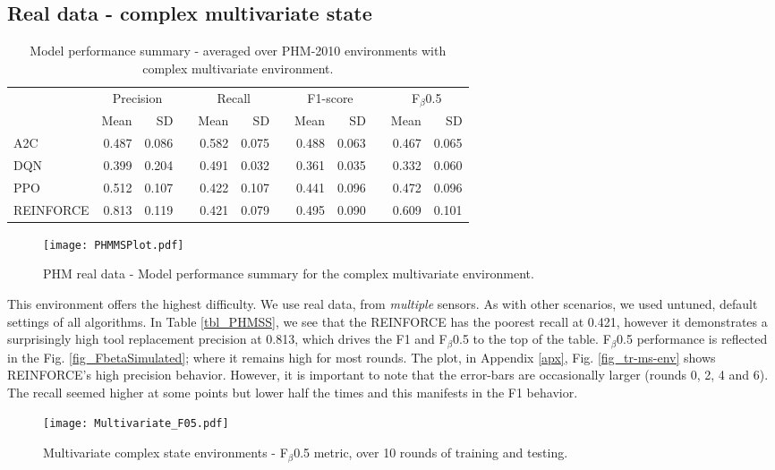 \documentclass[referee, sn-mathphys-num]{sn-jnl}
\newcommand{\rowspace}[1]{\renewcommand{\arraystretch}{#1}}
\begin{document}
	\subsection{Real data - complex multivariate state}
	\begin{table}
		\rowspace{1.3}
		\caption{Model performance summary - averaged over PHM-2010 environments with complex multivariate environment.}
		{\begin{tabular}{@{}l rr c rr c rr c rr@{}}
				\arrayrulecolor{black!40}\toprule
				& \multicolumn{2}{c}{Precision} & \phantom{i} & \multicolumn{2}{c}{Recall} & \phantom{i} & \multicolumn{2}{c}{F1-score} & \phantom{i} & \multicolumn{2}{c}{F$_\beta$0.5} \\
				\cmidrule{2-3} \cmidrule{5-6} \cmidrule{8-9} \cmidrule{11-12} 
				
				&Mean &SD & &Mean &SD & &Mean &SD& &Mean & SD\\ \midrule
				A2C & 0.487 & 0.086 & &\textcolor{dblue}{0.582} & 0.075 & & 0.488 & 0.063 & &0.467 &0.065 \\
				DQN & 0.399 & 0.204 & &0.491 & 0.032 & & 0.361 & 0.035 & &0.332 &0.060 \\
				PPO & 0.512 & 0.107 & &0.422 & 0.107 & & 0.441 & 0.096 & &0.472 &0.096 \\
				REINFORCE & \textcolor{dblue}{0.813} & 0.119 & &0.421 & 0.079 & & \textcolor{dblue}{0.495} & 0.090 & &\textcolor{dblue}{0.609} &0.101 \\
				\bottomrule
		\end{tabular}}
		\label{tbl_PHMMS}
	\end{table}
	\begin{figure}[hbt!]
		\centering
		\texttt{[image: PHMMSPlot.pdf]}  
		\caption{PHM real data - Model performance summary for the complex multivariate environment.}
		\label{fig_PHMMS}
	\end{figure}
	This environment offers the highest difficulty. We use real data, from \textit{multiple} sensors. As with other scenarios, we used untuned, default settings of all algorithms. In Table \ref{tbl_PHMSS}, we see that the REINFORCE has the poorest recall at 0.421, however it demonstrates a surprisingly high tool replacement precision at 0.813, which drives the F1 and F$_\beta$0.5 to the top of the table. F$_\beta$0.5 performance is reflected in the Fig. \ref{fig_FbetaSimulated}; where it remains high for most rounds. The plot, in Appendix \ref{apx}, Fig. \ref{fig_tr-ms-env} shows REINFORCE's high precision behavior. However, it is important to note that the error-bars are occasionally larger (rounds 0, 2, 4 and 6). The recall seemed higher at some points but lower half the times and this manifests in the F1 behavior.
	\begin{figure}[hbt!]
		\centering
		\texttt{[image: Multivariate\_F05.pdf]}  
		\caption{Multivariate complex state environments - F$_\beta$0.5 metric, over 10 rounds of training and testing.}
		\label{fig_FbetaPHMMS}
	\end{figure}
	
\end{document}
